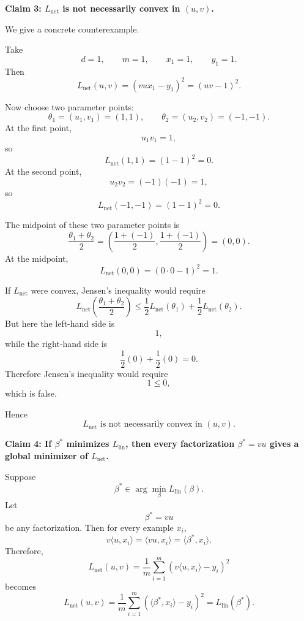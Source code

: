 \documentclass[11pt]{article}
\begin{document}
\begin{enumerate}
\begin{solutionbox}
    \medskip

    \textbf{Claim 3: $L_{\mathrm{net}}$ is not necessarily convex in $(u,v)$.}

    We give a concrete counterexample.

    Take
    \[
    d=1,\qquad m=1,\qquad x_1=1,\qquad y_1=1.
    \]
    Then
    \[
    L_{\mathrm{net}}(u,v)
    =
    (vux_1-y_1)^2
    =
    (uv-1)^2.
    \]

    Now choose two parameter points:
    \[
    \theta_1=(u_1,v_1)=(1,1),
    \qquad
    \theta_2=(u_2,v_2)=(-1,-1).
    \]
    At the first point,
    \[
    u_1v_1=1,
    \]
    so
    \[
    L_{\mathrm{net}}(1,1)
    =
    (1-1)^2
    =
    0.
    \]
    At the second point,
    \[
    u_2v_2=(-1)(-1)=1,
    \]
    so
    \[
    L_{\mathrm{net}}(-1,-1)
    =
    (1-1)^2
    =
    0.
    \]

    The midpoint of these two parameter points is
    \[
    \frac{\theta_1+\theta_2}{2}
    =
    \left(\frac{1+(-1)}2,\frac{1+(-1)}2\right)
    =
    (0,0).
    \]
    At the midpoint,
    \[
    L_{\mathrm{net}}(0,0)
    =
    (0\cdot0-1)^2
    =
    1.
    \]

    If $L_{\mathrm{net}}$ were convex, Jensen's inequality would require
    \[
    L_{\mathrm{net}}\!\left(\frac{\theta_1+\theta_2}{2}\right)
    \le
    \frac12L_{\mathrm{net}}(\theta_1)
    +
    \frac12L_{\mathrm{net}}(\theta_2).
    \]
    But here the left-hand side is
    \[
    1,
    \]
    while the right-hand side is
    \[
    \frac12(0)+\frac12(0)=0.
    \]
    Therefore Jensen's inequality would require
    \[
    1\le0,
    \]
    which is false.

    Hence
    \[
    \boxed{
    L_{\mathrm{net}}\text{ is not necessarily convex in }(u,v).
    }
    \]

    \medskip

    \textbf{Claim 4: If $\beta^\ast$ minimizes $L_{\mathrm{lin}}$, then every factorization $\beta^\ast=vu$ gives a global minimizer of $L_{\mathrm{net}}$.}

    Suppose
    \[
    \beta^\ast\in\arg\min_\beta L_{\mathrm{lin}}(\beta).
    \]
    Let
    \[
    \beta^\ast=vu
    \]
    be any factorization. Then for every example $x_i$,
    \[
    v\langle u,x_i\rangle
    =
    \langle vu,x_i\rangle
    =
    \langle\beta^\ast,x_i\rangle.
    \]
    Therefore,
    \[
    L_{\mathrm{net}}(u,v)
    =
    \frac1m\sum_{i=1}^m
    (v\langle u,x_i\rangle-y_i)^2
    \]
    becomes
    \[
    L_{\mathrm{net}}(u,v)
    =
    \frac1m\sum_{i=1}^m
    (\langle\beta^\ast,x_i\rangle-y_i)^2
    =
    L_{\mathrm{lin}}(\beta^\ast).
    \]


\end{solutionbox}
\end{enumerate}
\end{document}

